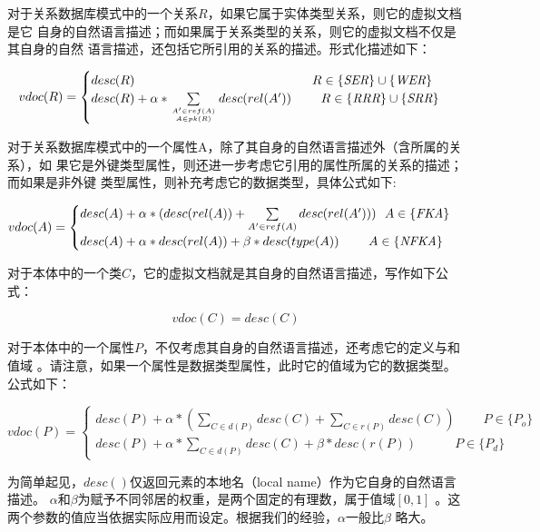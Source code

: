 对于关系数据库模式中的一个关系$R$，如果它属于实体类型关系，则它的虚拟文档是它
自身的自然语言描述；而如果属于关系类型的关系，则它的虚拟文档不仅是其自身的自然
语言描述，还包括它所引用的关系的描述。形式化描述如下：

\begin{equation}
vdoc(R)=
\begin{cases}
desc(R)
\qquad \qquad \qquad \qquad \qquad \qquad \qquad
 R \in \{\emph{SER}\} \cup \{\emph{WER}\}
\\
desc(R)+ \alpha \ast \sum\limits_{A^\prime \in ref(A) \atop A \in pk(R)}
desc(rel(A^\prime))
\qquad \ R \in \{\emph{RRR}\} \cup \{\emph{SRR}\}
\end{cases}
\end{equation}

对于关系数据库模式中的一个属性A，除了其自身的自然语言描述外（含所属的关系），如
果它是外键类型属性，则还进一步考虑它引用的属性所属的关系的描述；而如果是非外键
类型属性，则补充考虑它的数据类型，具体公式如下:

\begin{equation}
vdoc(A)=
\begin{cases}
desc(A)+ \alpha \ast (desc(rel(A)) + \sum\limits_{A^\prime \in ref(A)}
desc(rel(A^\prime)))
\ \ A \in \{\emph{FKA}\}
\\
desc(A)+ \alpha \ast desc(rel(A)) + \beta \ast desc(type(A))
\qquad \ A \in \{\emph{NFKA}\}
\end{cases}
\end{equation}

对于本体中的一个类$C$，它的虚拟文档就是其自身的自然语言描述，写作如下公式：

\begin{equation}
vdoc(C) = desc(C)
\end{equation}

对于本体中的一个属性$P$，不仅考虑其自身的自然语言描述，还考虑它的定义与和值域
。请注意，如果一个属性是数据类型属性，此时它的值域为它的数据类型。公式如下：

\begin{equation}
vdoc(P)=
\begin{cases}
desc(P) + \alpha \ast (
	\sum\limits_{C \in d(P)} desc(C) +
	\sum\limits_{C \in r(P)} desc(C))
\qquad \ P \in \{P_o\}
\\
desc(P) + \alpha \ast \sum\limits_{C \in d(P)} desc(C)
	+ \beta \ast desc(r(P))
\qquad \quad  P \in \{P_d\}
\end{cases}
\end{equation}

为简单起见，$desc()$仅返回元素的本地名（local name）作为它自身的自然语言描述。
$\alpha$和$\beta$为赋予不同邻居的权重，是两个固定的有理数，属于值域$[0,1]$
。这两个参数的值应当依据实际应用而设定。根据我们的经验，$\alpha$一般比$\beta$
略大。


